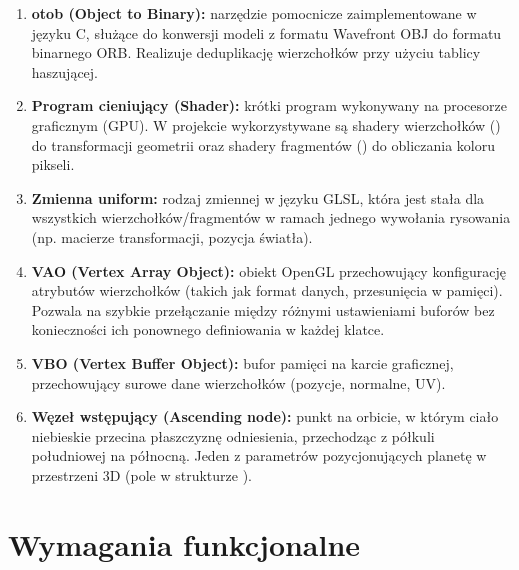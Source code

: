 \begin{enumerate}
        \item \textbf{otob (Object to Binary):} narzędzie pomocnicze zaimplementowane w języku C, służące do konwersji modeli z formatu Wavefront OBJ do formatu binarnego ORB. Realizuje deduplikację wierzchołków przy użyciu tablicy haszującej.
        \item \textbf{Program cieniujący (Shader):} krótki program wykonywany na procesorze graficznym (GPU). W projekcie wykorzystywane są shadery wierzchołków () do transformacji geometrii oraz shadery fragmentów () do obliczania koloru pikseli.
        \item \textbf{Zmienna uniform:} rodzaj zmiennej w języku GLSL, która jest stała dla wszystkich wierzchołków/fragmentów w ramach jednego wywołania rysowania (np. macierze transformacji, pozycja światła).
        \item \textbf{VAO (Vertex Array Object):} obiekt OpenGL przechowujący konfigurację atrybutów wierzchołków (takich jak format danych, przesunięcia w pamięci). Pozwala na szybkie przełączanie między różnymi ustawieniami buforów bez konieczności ich ponownego definiowania w każdej klatce.
        \item \textbf{VBO (Vertex Buffer Object):}  bufor pamięci na karcie graficznej, przechowujący surowe dane wierzchołków (pozycje, normalne, UV).
        \item \textbf{Węzeł wstępujący (Ascending node):} punkt na orbicie, w którym ciało niebieskie przecina płaszczyznę odniesienia, przechodząc z półkuli południowej na północną. Jeden z parametrów pozycjonujących planetę w przestrzeni 3D (pole  w strukturze ).
    \end{enumerate}

    \newpage

    \section{Wymagania funkcjonalne}


